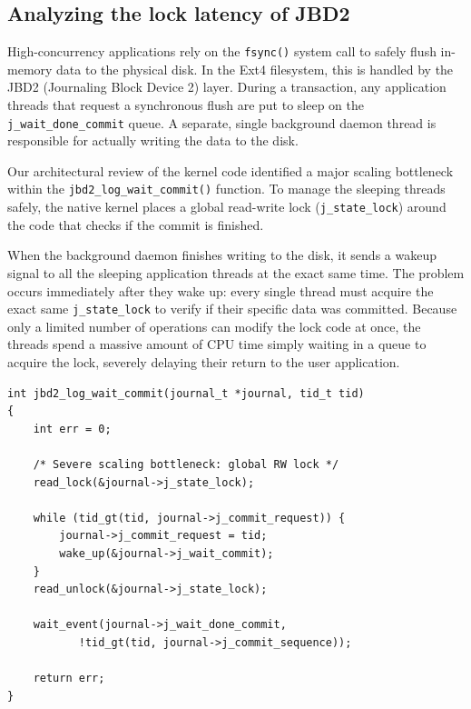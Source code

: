\subsection{Analyzing the lock latency of JBD2}
\label{sec:cpu_profiling}

High-concurrency applications rely on the \texttt{fsync()} system call to safely flush in-memory data to the physical disk. In the Ext4 filesystem, this is handled by the JBD2 (Journaling Block Device 2) layer. During a transaction, any application threads that request a synchronous flush are put to sleep on the \texttt{j\_wait\_done\_commit} queue. A separate, single background daemon thread is responsible for actually writing the data to the disk.

Our architectural review of the kernel code identified a major scaling bottleneck within the \texttt{jbd2\_log\_wait\_commit()} function. To manage the sleeping threads safely, the native kernel places a global read-write lock (\texttt{j\_state\_lock}) around the code that checks if the commit is finished.

When the background daemon finishes writing to the disk, it sends a wakeup signal to all the sleeping application threads at the exact same time. The problem occurs immediately after they wake up: every single thread must acquire the exact same \texttt{j\_state\_lock} to verify if their specific data was committed. Because only a limited number of operations can modify the lock code at once, the threads spend a massive amount of CPU time simply waiting in a queue to acquire the lock, severely delaying their return to the user application.

\begin{lstlisting}[caption={The Native Ext4 Implementation (Problematic)}, label={lst:native}]
int jbd2_log_wait_commit(journal_t *journal, tid_t tid)
{
    int err = 0;
    
    /* Severe scaling bottleneck: global RW lock */
    read_lock(&journal->j_state_lock);
    
    while (tid_gt(tid, journal->j_commit_request)) {
        journal->j_commit_request = tid;
        wake_up(&journal->j_wait_commit);
    }
    read_unlock(&journal->j_state_lock);

    wait_event(journal->j_wait_done_commit,
           !tid_gt(tid, journal->j_commit_sequence));
           
    return err;
}
\end{lstlisting}

